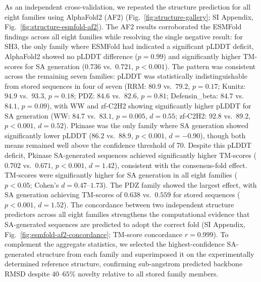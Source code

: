 As an independent cross-validation, we repeated the structure prediction for all eight families using AlphaFold2 (AF2) (Fig.~\ref{fig:structure-gallery}; SI Appendix, Fig.~\ref{fig:structure-esmfold-af2}). The AF2 results corroborated the ESMFold findings across all eight families while resolving the single negative result: for SH3, the only family where ESMFold had indicated a significant pLDDT deficit, AlphaFold2 showed no pLDDT difference ($p{=}0.99$) and significantly higher TM-scores for SA generation ($0.736$ vs.\ $0.721$, $p < 0.001$). The pattern was consistent across the remaining seven families: pLDDT was statistically indistinguishable from stored sequences in four of seven (RRM: $80.9$ vs.\ $79.2$, $p{=}0.17$; Kunitz: $94.9$ vs.\ $93.3$, $p{=}0.18$; PDZ: $84.6$ vs.\ $82.6$, $p{=}0.81$; Defensin\_beta: $84.7$ vs.\ $84.1$, $p{=}0.09$), with WW and zf-C2H2 showing significantly higher pLDDT for SA generation (WW: $84.7$ vs.\ $83.1$, $p{=}0.005$, $d{=}0.55$; zf-C2H2: $92.8$ vs.\ $89.2$, $p < 0.001$, $d{=}0.52$). Pkinase was the only family where SA generation showed significantly lower pLDDT ($86.2$ vs.\ $88.9$, $p < 0.001$, $d{=}{-}0.90$), though both means remained well above the confidence threshold of 70. Despite this pLDDT deficit, Pkinase SA-generated sequences achieved significantly higher TM-scores ($0.702$ vs.\ $0.671$, $p < 0.001$, $d{=}1.42$), consistent with the consensus-fold effect. TM-scores were significantly higher for SA generation in all eight families ($p < 0.05$; Cohen's $d{=}0.47$--$1.73$). The PDZ family showed the largest effect, with SA generation achieving TM-scores of $0.638$ vs.\ $0.559$ for stored sequences ($p < 0.001$, $d{=}1.52$). The concordance between two independent structure predictors across all eight families strengthens the computational evidence that SA-generated sequences are predicted to adopt the correct fold (SI Appendix, Fig.~\ref{fig:esmfold-af2-concordance}; TM-score concordance $r{=}0.999$). To complement the aggregate statistics, we selected the highest-confidence SA-generated structure from each family and superimposed it on the experimentally determined reference structure, confirming sub-angstrom predicted backbone RMSD despite $40$--$65\%$ novelty relative to all stored family members.

